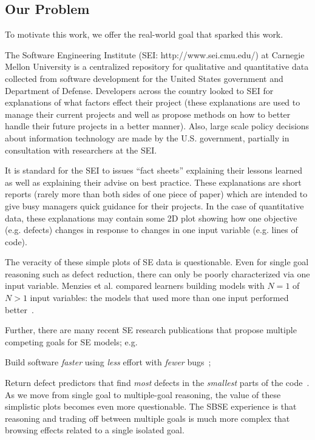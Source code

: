 \subsection{Our Problem}
To motivate this work, we offer the real-world goal that sparked this work.

The Software Engineering Institute (SEI:
http://www.sei.cmu.edu/) at Carnegie Mellon
University is a centralized repository for
qualitative and quantitative data collected from
software development for the United States
government and Department of Defense. Developers
across the country looked to SEI for explanations of
what factors effect their project (these
explanations are used to manage their current
projects and well as propose methods on how to
better handle their future projects in a better
manner).  Also, large scale policy decisions about
information technology are made by the
U.S. government, partially in consultation with
researchers at the SEI.

It is standard for the
SEI to issues ``fact sheets'' explaining their
lessons learned as well as explaining their advise
on best practice. These explanations are short
reports (rarely more than both sides of one piece of
paper) which are intended to give busy managers
quick guidance for their projects.  In the case of
quantitative data, these explanations may
contain some 2D plot showing how one
objective  (e.g. defects) changes in
response to changes in one input variable
(e.g. lines of code).

The veracity of these simple plots
of SE data is questionable. Even
for single goal reasoning such as defect reduction,
there  can only be  poorly
characterized via one input variable.  Menzies et
al. compared learners building models with $N=1$
of $N>1$ input variables: the models that used more
than one input performed better~\cite{me07b}.

Further, there are many recent SE research publications that
propose multiple competing goals for SE models; e.g.
\bi
\item 
Build software
{\em faster} using {\em less} effort with {\em fewer} bugs~\cite{elrawas10};
\item
Return defect predictors that find {\em most} defects in the {\em smallest}
parts of the code~\cite{arisholm06}.
\ei
As we move from single goal to
multiple-goal reasoning, the value of these
simplistic  plots becomes even more
questionable. The SBSE experience is that reasoning
and trading off between multiple goals is much more
complex that browsing effects related to a single
isolated goal.

